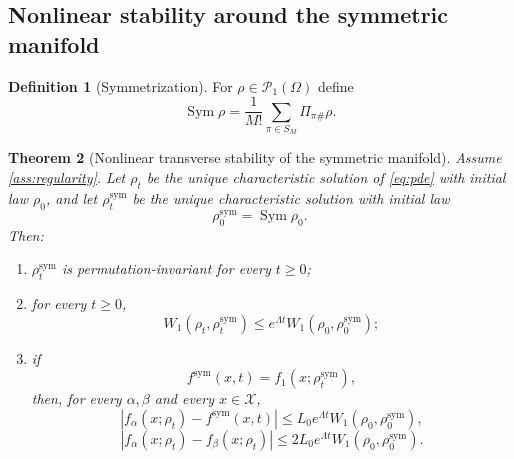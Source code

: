 \documentclass[11pt]{article}
\newtheorem{theorem}{Theorem}[section]
\theoremstyle{definition}
\newtheorem{definition}[theorem]{Definition}
\newcommand{\PP}{\mathcal{P}}
\newcommand{\W}{W_1}
\newcommand{\Sym}{\operatorname{Sym}}
\begin{document}
\subsection{Nonlinear stability around the symmetric manifold}

\begin{definition}[Symmetrization]
For $\rho \in \PP_1(\Omega)$ define
\begin{equation}
  \Sym \rho
  =
  \frac1{M!} \sum_{\pi \in S_M} \Pi_{\pi\#}\rho.
  \label{eq:symmetrization}
\end{equation}
\end{definition}

\begin{theorem}[Nonlinear transverse stability of the symmetric manifold]
\label{thm:nonlinear-stability}
Assume \cref{ass:regularity}.
Let $\rho_t$ be the unique characteristic solution of \eqref{eq:pde} with initial law $\rho_0$,
and let $\rho_t^{\mathrm{sym}}$ be the unique characteristic solution with initial law
\[
  \rho_0^{\mathrm{sym}}=\Sym \rho_0.
\]
Then:
\begin{enumerate}[leftmargin=2em]
  \item $\rho_t^{\mathrm{sym}}$ is permutation-invariant for every $t\ge 0$;
  \item for every $t\ge 0$,
  \begin{equation}
    \W(\rho_t,\rho_t^{\mathrm{sym}})
    \le
    e^{\Lambda t}\W(\rho_0,\rho_0^{\mathrm{sym}});
    \label{eq:nonlinear-stability}
  \end{equation}
  \item if
  \[
    f^{\mathrm{sym}}(x,t)=f_1(x;\rho_t^{\mathrm{sym}}),
  \]
  then, for every $\alpha,\beta$ and every $x\in \mathcal X$,
  \begin{equation}
    |f_\alpha(x;\rho_t)-f^{\mathrm{sym}}(x,t)|
    \le
    L_0 e^{\Lambda t}\W(\rho_0,\rho_0^{\mathrm{sym}}),
    \label{eq:transverse-output}
  \end{equation}
  \begin{equation}
    |f_\alpha(x;\rho_t)-f_\beta(x;\rho_t)|
    \le
    2L_0 e^{\Lambda t}\W(\rho_0,\rho_0^{\mathrm{sym}}).
    \label{eq:transverse-disagreement}
  \end{equation}
\end{enumerate}
\end{theorem}
\end{document}
